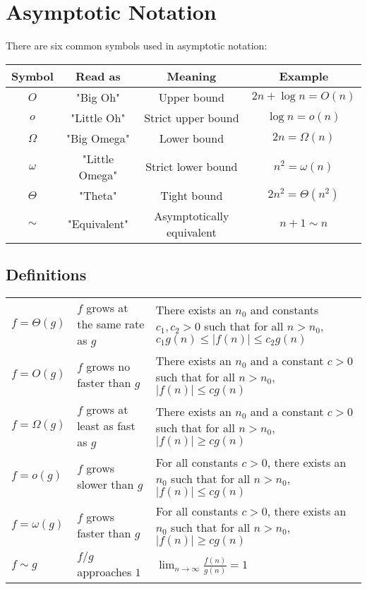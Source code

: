 \documentclass[../main.tex]{subfiles}
\begin{document}
\section{Asymptotic Notation}

There are six common symbols used in asymptotic notation:

\begin{center}
\begin{tabular}{c|c|c|c}
  Symbol   & Read as        & Meaning                   & Example              \\
  \hline
  $O$      & "Big Oh"       & Upper bound               & $2n + \log n = O(n)$ \\
  $o$      & "Little Oh"    & Strict upper bound        & $\log n = o(n)$      \\
  $\Omega$ & "Big Omega"    & Lower bound               & $2n = \Omega(n)$     \\
  $\omega$ & "Little Omega" & Strict lower bound        & $n^2 = \omega(n)$    \\
  $\Theta$ & "Theta"        & Tight bound               & $2n^2 = \Theta(n^2)$ \\
  $\sim$   & "Equivalent"   & Asymptotically equivalent & $n+1 \sim n$
\end{tabular}
\end{center}

\subsection{Definitions}

\begin{center}
  \begin{tabular}{l l p{9cm}}
  $f = \Theta(g)$ & $f$ grows at the same rate as $g$ & There exists an $n_0$ and constants $c_1, c_2 > 0$ such that for all $n > n_0$, $c_1g(n) \le \left|f(n)\right| \le c_2g(n)$ \\

  $f = O(g)$      & $f$ grows no faster than $g$      & There exists an $n_0$ and a constant $c > 0$ such that for all $n > n_0$, $\left|f(n)\right| \le cg(n)$ \\

  $f = \Omega(g)$ & $f$ grows at least as fast as $g$ & There exists an $n_0$ and a constant $c > 0$ such that for all $n > n_0$, $\left|f(n)\right| \ge cg(n)$ \\

  $f = o(g)$      & $f$ grows slower than $g$         & For all constants $c > 0$, there exists an $n_0$ such that for all $n > n_0$, $\left|f(n)\right| \le cg(n)$ \\

  $f = \omega(g)$ & $f$ grows faster than $g$         & For all constants $c > 0$, there exists an $n_0$ such that for all $n > n_0$, $\left|f(n)\right| \ge cg(n)$ \\

  $f \sim g$      & $f/g$ approaches $1$              & $\lim_{n \to \infty} \frac{f(n)}{g(n)} = 1$
\end{tabular}
\end{center}
\end{document}
